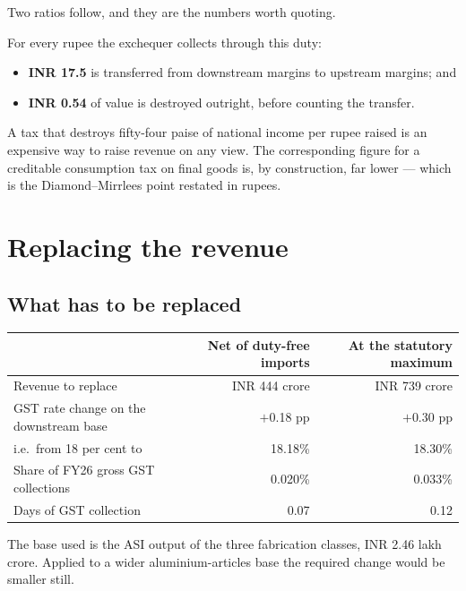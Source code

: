 \documentclass[11pt, a4paper]{article}
\begin{document}
\noindent Two ratios follow, and they are the numbers worth quoting.

\begin{keybox}
For every rupee the exchequer collects through this duty:
\begin{itemize}[leftmargin=1.4em, itemsep=1pt, topsep=3pt]
\item \textbf{INR 17.5} is transferred from downstream margins to upstream margins; and
\item \textbf{INR 0.54} of value is destroyed outright, before counting the transfer.
\end{itemize}
A tax that destroys fifty-four paise of national income per rupee raised is an
expensive way to raise revenue on any view. The corresponding figure for a creditable
consumption tax on final goods is, by construction, far lower --- which is the
Diamond--Mirrlees point restated in rupees.
\end{keybox}

\section{Replacing the revenue}

\subsection{What has to be replaced}

\begin{table}[H]
\centering
\small
\begin{tabular}{lrr}
\toprule
& \textbf{Net of duty-free imports} & \textbf{At the statutory maximum} \\
\midrule
Revenue to replace & INR 444 crore & INR 739 crore \\
GST rate change on the downstream base & $+$0.18 pp & $+$0.30 pp \\
\quad i.e.\ from 18 per cent to & 18.18\% & 18.30\% \\
Share of FY26 gross GST collections & 0.020\% & 0.033\% \\
Days of GST collection & 0.07 & 0.12 \\
\bottomrule
\end{tabular}
\end{table}

\noindent The base used is the ASI output of the three fabrication classes,
INR 2.46 lakh crore. Applied to a wider aluminium-articles base the required change
would be smaller still.
\end{document}

